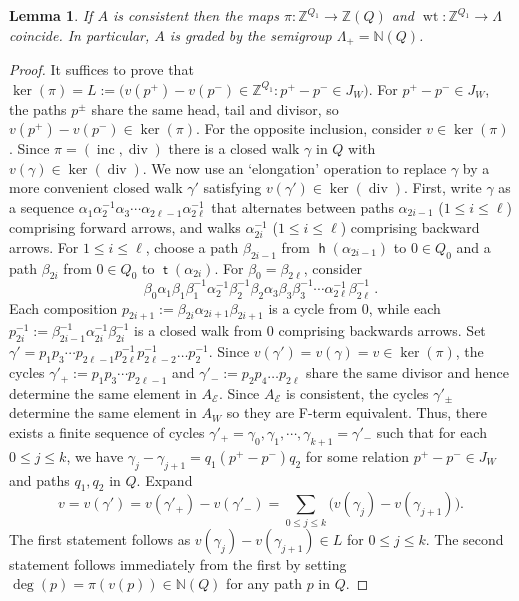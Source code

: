 \documentclass[11pt,a4paper]{amsart}
\numberwithin{equation}{section}
\newtheorem{lemma}[theorem]{Lemma}
\theoremstyle{definition}
\theoremstyle{remark}
\newcommand{\NN}{\ensuremath{\mathbb{N}}}
\newcommand{\ZZ}{\ensuremath{\mathbb{Z}}}
\renewcommand{\div}{\operatorname{div}}
\newcommand{\head}{\operatorname{\mathsf{h}}}
\newcommand{\inc}{\operatorname{inc}}
\newcommand{\tail}{\operatorname{\mathsf{t}}}
\newcommand{\wt}{\operatorname{wt}}
\newcommand{\Ker}{\operatorname{ker}}
\begin{document}
 \begin{lemma} 
 \label{lem:Kergens}
 If $A$ is consistent then the maps $\pi\colon \ZZ^{Q_1}\to \ZZ(Q)$ and $\wt\colon \ZZ^{Q_1}\to\Lambda$ coincide. In particular, $A$ is graded by the semigroup $\Lambda_+= \NN(Q)$.
 \end{lemma}
 \begin{proof}
 It suffices to prove that $\Ker(\pi) = L:=\big(v(p^+) - v(p^-)\in \ZZ^{Q_1} :  p^+-p^-\in J_W\big)$. For $p^+-p^-\in J_W$, the paths $p^{\pm}$ share the same head, tail and divisor, so $v(p^+) - v(p^-)\in \Ker(\pi)$. For the opposite inclusion, consider $v\in \Ker(\pi)$. Since $\pi = (\inc, \div)$ there is a closed walk $\gamma$ in $Q$ with $v(\gamma) \in \Ker(\div)$. We now use an `elongation' operation to replace $\gamma$ by a more convenient closed walk $\gamma'$ satisfying $v(\gamma')\in \Ker(\div)$. First, write $\gamma$ as a sequence $\alpha_1^{\,} \alpha_2^{-1} \alpha_3^{\,} \dotsb  \alpha_{2\ell -1}^{\,} \alpha_{2 \ell}^{-1}$ that alternates between paths $\alpha_{2i-1}$ ($1\leq i\leq \ell$) comprising forward arrows, and walks $\alpha_{2i}^{-1}$ ($1\leq i\leq \ell$) comprising backward arrows. For $1\leq i\leq \ell$, choose a path $\beta_{2i-1}$ from $\head(\alpha_{2i-1})$ to $0\in Q_0$ and a path $\beta_{2i}$ from $0\in Q_0$ to $\tail(\alpha_{2i})$.  For $\beta_{0} = \beta_{2 \ell}$, consider
    \[
    \beta_{0}^{\,} \alpha_1^{\,}\beta_1^{\,}
    \beta_1^{-1}\alpha_2^{-1} \beta_{2}^{-1}\beta_2^{\,} \alpha_3^{\,}
    \beta_3^{\,} \beta_3^{-1} \dotsb \alpha_{2 \ell}^{-1}
    \beta_{2\ell}^{-1} \, .
    \]  
   Each composition $p_{2i+1}:=\beta_{2i}\alpha_{2i+1}\beta_{2i+1}$ is a cycle from $0$, while each $p_{2i}^{-1}:= \beta_{2i-1}^{-1}\alpha_{2i}^{-1}\beta_{2i}^{-1}$ is a closed walk from 0 comprising backwards arrows. Set $\gamma' = p_1p_3\cdots p_{2\ell-1}p_{2\ell}^{-1}p_{2\ell-2}^{-1}\dots p_{2}^{-1}$. Since $v(\gamma')=v(\gamma)= v\in \Ker(\pi)$, the cycles $\gamma'_+:=p_1p_3\cdots p_{2\ell-1}$ and $\gamma'_-:=p_2p_4\dots p_{2\ell}$ share the same divisor and hence determine the same element in $A_{\mathscr{E}}$. Since $A_{\mathscr{E}}$ is consistent, the cycles $\gamma'_{\pm}$ determine the same element in $A_W$ so they are F-term equivalent. Thus,  there exists a finite sequence of cycles $\gamma'_+=\gamma_0, \gamma_1,\dotsb, \gamma_{k+1}=\gamma'_-$ such that for each $0\leq j\leq k$, we have $\gamma_j-\gamma_{j+1} = q_1(p^+-p^-)q_2$ for some relation $p^+-p^-\in J_W$ and paths $q_1, q_2$ in $Q$. Expand 
   \[
   v = v(\gamma') = v(\gamma'_+) - v(\gamma'_-) =  \sum_{0\leq j\leq k} \big(v(\gamma_j) - v(\gamma_{j+1})\big).
   \]
 The first statement follows as $v(\gamma_j) - v(\gamma_{j+1})\in L$ for $0\leq j\leq k$. The second statement follows immediately from the first by setting $\deg(p) = \pi(v(p))\in \NN(Q)$ for any path $p$ in $Q$.
  \end{proof}
\end{document}
